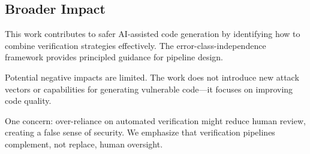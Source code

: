 \subsection{Broader Impact}

This work contributes to safer AI-assisted code generation by identifying how to combine verification strategies effectively. The error-class-independence framework provides principled guidance for pipeline design.

Potential negative impacts are limited. The work does not introduce new attack vectors or capabilities for generating vulnerable code---it focuses on improving code quality.

One concern: over-reliance on automated verification might reduce human review, creating a false sense of security. We emphasize that verification pipelines complement, not replace, human oversight.
